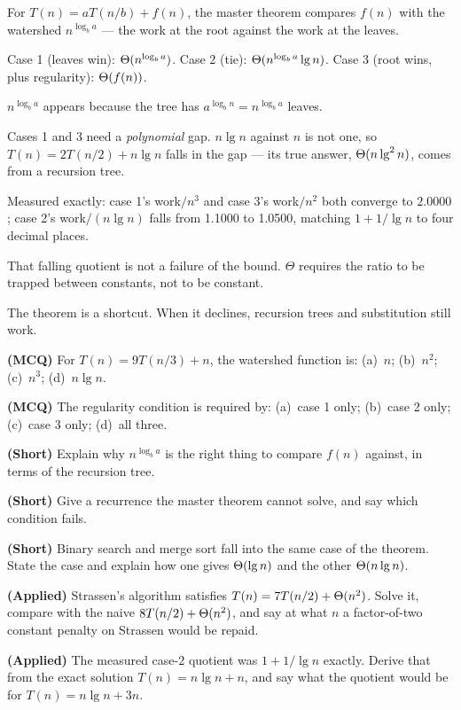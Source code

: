 \begin{chaptersummary}
\begin{tight}
  \item For $T(n) = aT(n/b) + f(n)$, the master theorem compares $f(n)$ with
        the watershed $n^{\log_{b} a}$ --- the work at the root against the
        work at the leaves.
  \item Case 1 (leaves win): $\Theta(n^{\log_{b}a})$. Case 2 (tie):
        $\Theta(n^{\log_{b}a}\operatorname{lg} n)$. Case 3 (root wins, plus regularity):
        $\Theta(f(n))$.
  \item $n^{\log_{b}a}$ appears because the tree has $a^{\log_{b} n} =
        n^{\log_{b}a}$ leaves.
  \item Cases 1 and 3 need a \emph{polynomial} gap. $n\lg n$ against $n$ is not
        one, so $T(n)=2T(n/2)+n\lg n$ falls in the gap --- its true answer,
        $\Theta(n\operatorname{lg}^{2}n)$, comes from a recursion tree.
  \item Measured exactly: case 1's work$/n^{3}$ and case 3's work$/n^{2}$ both
        converge to $2.0000$; case 2's work$/(n\lg n)$ falls from 1.1000 to
        1.0500, matching $1 + 1/\lg n$ to four decimal places.
  \item That falling quotient is not a failure of the bound. $\Theta$ requires
        the ratio to be trapped between constants, not to be constant.
  \item The theorem is a shortcut. When it declines, recursion trees and
        substitution still work.
\end{tight}
\end{chaptersummary}

\begin{reviewq}
  \item \textbf{(MCQ)} For $T(n) = 9T(n/3) + n$, the watershed function is:
        (a)~$n$; (b)~$n^{2}$; (c)~$n^{3}$; (d)~$n\lg n$.
  \item \textbf{(MCQ)} The regularity condition is required by:
        (a)~case 1 only; (b)~case 2 only; (c)~case 3 only; (d)~all three.
  \item \textbf{(Short)} Explain why $n^{\log_{b}a}$ is the right thing to
        compare $f(n)$ against, in terms of the recursion tree.
  \item \textbf{(Short)} Give a recurrence the master theorem cannot solve, and
        say which condition fails.
  \item \textbf{(Short)} Binary search and merge sort fall into the same case
        of the theorem. State the case and explain how one gives $\Theta(\operatorname{lg} n)$
        and the other $\Theta(n\operatorname{lg} n)$.
  \item \textbf{(Applied)} Strassen's algorithm satisfies $T(n) = 7T(n/2) +
        \Theta(n^{2})$. Solve it, compare with the naive $8T(n/2) +
        \Theta(n^{2})$, and say at what $n$ a factor-of-two constant penalty on
        Strassen would be repaid.
  \item \textbf{(Applied)} The measured case-2 quotient was $1 + 1/\lg n$
        exactly. Derive that from the exact solution $T(n) = n\lg n + n$, and
        say what the quotient would be for $T(n) = n\lg n + 3n$.
\end{reviewq}
